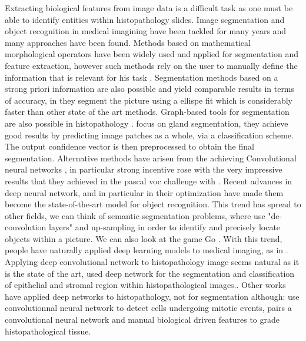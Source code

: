 \documentclass[a4paper,10pt]{article}
\begin{document}
Extracting biological features from image data is a difficult task as one must be able to identify entities within histopathology slides. Image segmentation and object recognition in medical imagining have been tackled for many years and many approaches have been found. Methods based on mathematical morphological operators have been widely used and applied for segmentation and feature extraction, however such methods rely on the user to manually define the information that is relevant for his task \citep{irshad2014methods}. Segmentation methods based on a strong priori information are also possible and yield comparable results in terms of accuracy, in \citet{ranefall2016fast} they segment the picture using a ellispe fit which is considerably faster than other state of the art methods. Graph-based tools for segmentation are also possible in histopathology \citep{ta2009graph}. \citet{manivannanlocal} focus on gland segmentation, they achieve good results by predicting image patches as a whole, via a classification scheme. The output confidence vector is then preprocessed to obtain the final segmentation. Alternative methods have arisen from the achieving Convolutional neural networks \citep{lecun}, in particular strong incentive rose with the very impressive results that they achieved in the pascal voc challenge with \citet{ImageNet}. Recent advances in deep neural network, and in particular in their optimization have made them become the state-of-the-art model for object recognition. 
This trend has spread to other fields, we can think of semantic segmentation problems, where \citet{long2015fcn} use "de-convolution layers" and up-sampling in order to identify and precisely locate objects within a picture. We can also look at the game Go 
\citep{AlphaGo}. With this trend, people have naturally applied deep learning models to medical imaging, as in \citet{UNet}. Applying deep convolutional network to histopathology image seems natural as it is the state of the art, \citet{xu2016deep} used deep network for the segmentation and classification of epithelial and stromal region within histopathological images..
Other works have applied deep networks to histopathology, not for segmentation although: \citet{cirecsan2013mitosis} use convolutionnal neural network to detect cells undergoing mitotic events, \citet{jiajia2016automatic} pairs a convolutional neural network and manual biological driven features to grade histopathological tissue.
\end{document}
